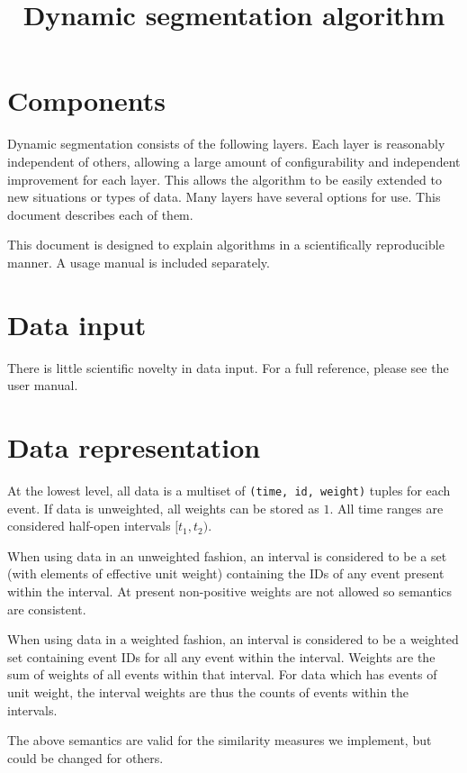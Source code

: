 \documentclass[draft]{article}
\title{Dynamic segmentation algorithm}
\begin{document}
\maketitle

\section{Components}

Dynamic segmentation consists of the following layers.  Each layer is
reasonably independent of others, allowing a large amount of
configurability and independent improvement for each layer.  This
allows the algorithm to be easily extended to new situations or types
of data.  Many layers have several options for use.  This document
describes each of them.

This document is designed to explain algorithms in a scientifically
reproducible manner.  A usage manual is included separately.

\section{Data input}
\label{sec:meth-input}
There is little scientific novelty in data input.  For a full
reference, please see the user manual.

\section{Data representation}
\label{sec:meth-representation}
At the lowest level, all data is a multiset of \texttt{(time, id,
  weight)} tuples for each event.  If data is unweighted, all weights
can be stored as $1$.  All time ranges are considered half-open
intervals $[t_1, t_2)$.

When using data in an unweighted fashion, an interval is considered to
be a set (with elements of effective unit weight) containing the IDs
of any event present within the interval.  At present non-positive
weights are not allowed so semantics are consistent.

When using data in a weighted fashion, an interval is considered to be
a weighted set containing event IDs for all any event within the
interval.  Weights are the sum of weights of all events within that
interval.  For data which has events of unit weight, the interval
weights are thus the counts of events within the intervals.

The above semantics are valid for  the similarity measures we
implement, but could be changed for others.
\end{document}
